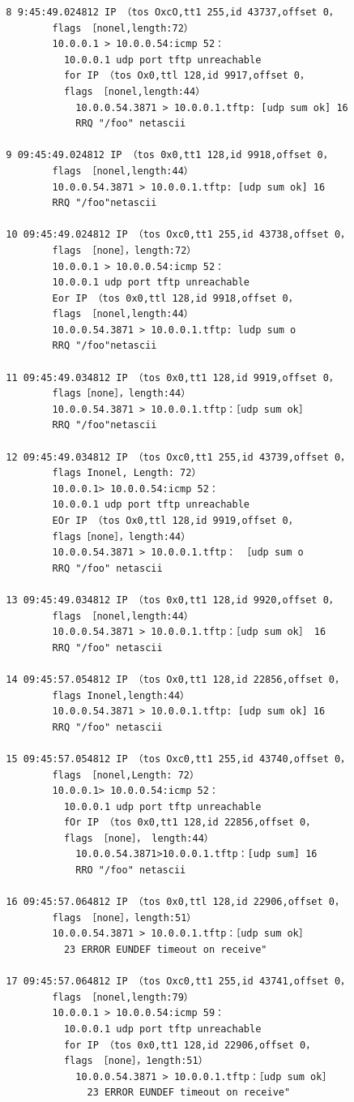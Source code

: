 \begin{verbatim}
  8 9:45:49.024812 IP （tos OxcO,tt1 255,id 43737,offset 0，
          flags ［nonel,length:72）
          10.0.0.1 > 10.0.0.54:icmp 52：
            10.0.0.1 udp port tftp unreachable
            for IP （tos Ox0,ttl 128,id 9917,offset 0，
            flags ［nonel,length:44）
              10.0.0.54.3871 > 10.0.0.1.tftp: [udp sum ok] 16
              RRQ "/foo" netascii

  9 09:45:49.024812 IP （tos 0x0,tt1 128,id 9918,offset 0，
          flags ［nonel,length:44）
          10.0.0.54.3871 > 10.0.0.1.tftp: [udp sum ok] 16
          RRQ "/foo"netascii

  10 09:45:49.024812 IP （tos Oxc0,tt1 255,id 43738,offset 0，
          flags ［none］，length:72）
          10.0.0.1 > 10.0.0.54:icmp 52：
          10.0.0.1 udp port tftp unreachable
          Eor IP （tos 0x0,ttl 128,id 9918,offset 0，
          flags ［nonel,length:44）
          10.0.0.54.3871 > 10.0.0.1.tftp: ludp sum o
          RRQ "/foo"netascii

  11 09:45:49.034812 IP （tos 0x0,tt1 128,id 9919,offset 0，
          flags［none］，length:44）
          10.0.0.54.3871 > 10.0.0.1.tftp：［udp sum ok］
          RRQ "/foo"netascii

  12 09:45:49.034812 IP （tos Oxc0,tt1 255,id 43739,offset 0，
          flags Inonel, Length: 72）
          10.0.0.1> 10.0.0.54:icmp 52：
          10.0.0.1 udp port tftp unreachable
          EOr IP （tos Ox0,ttl 128,id 9919,offset 0，
          flags［none］，length:44）
          10.0.0.54.3871 > 10.0.0.1.tftp： ［udp sum o
          RRQ "/foo" netascii

  13 09:45:49.034812 IP （tos 0x0,tt1 128,id 9920,offset 0，
          flags ［nonel,length:44）
          10.0.0.54.3871 > 10.0.0.1.tftp：［udp sum ok］ 16
          RRQ "/foo" netascii

  14 09:45:57.054812 IP （tos Ox0,tt1 128,id 22856,offset 0，
          flags Inonel,length:44）
          10.0.0.54.3871 > 10.0.0.1.tftp: [udp sum ok] 16
          RRQ "/foo" netascii

  15 09:45:57.054812 IP （tos Oxc0,tt1 255,id 43740,offset 0，
          flags ［nonel,Length: 72）
          10.0.0.1> 10.0.0.54:icmp 52：
            10.0.0.1 udp port tftp unreachable
            fOr IP （tos 0x0,tt1 128,id 22856,offset 0，
            flags ［none］， length:44）
              10.0.0.54.3871>10.0.0.1.tftp：[udp sum] 16
              RRO "/foo" netascii

  16 09:45:57.064812 IP （tos 0x0,ttl 128,id 22906,offset 0，
          flags ［none］，length:51）
          10.0.0.54.3871 > 10.0.0.1.tftp：［udp sum ok］
            23 ERROR EUNDEF timeout on receive"

  17 09:45:57.064812 IP （tos Oxc0,tt1 255,id 43741,offset 0，
          flags ［nonel,length:79）
          10.0.0.1 > 10.0.0.54:icmp 59：
            10.0.0.1 udp port tftp unreachable
            for IP （tos 0x0,tt1 128,id 22906,offset 0，
            flags ［none］，1ength:51）
              10.0.0.54.3871 > 10.0.0.1.tftp：［udp sum ok］
                23 ERROR EUNDEF timeout on receive"
\end{verbatim}


